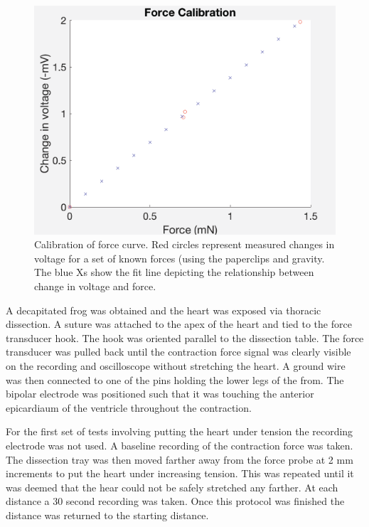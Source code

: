 \documentclass[12pt]{article}
\begin{document}
\begin{figure}[H]
	\label{fig:forceCal}
	\centering
	\includegraphics[width = .95\textwidth]{Figures/ForceCal.png}
	\caption{Calibration of force curve. Red circles represent measured changes in voltage for a  set of known forces (using the paperclips and gravity. The blue Xs show the fit line depicting the relationship between change in voltage and force. }
\end{figure}
\par{}
A decapitated frog was obtained and the heart was exposed via thoracic dissection. A suture was attached to the apex of the heart and tied to the force transducer hook. The hook was oriented parallel to the dissection table. The force transducer was pulled back until the contraction force signal was clearly visible on the recording and oscilloscope without stretching the heart. A ground wire was then connected to one of the pins holding the lower legs of the from. The bipolar electrode was positioned such that it was touching the anterior epicardiaum of the ventricle throughout the contraction. 
\par{}
For the first set of tests involving putting the heart under tension the recording electrode was not used. A baseline recording of the contraction force was taken. The dissection tray was then moved farther away from the force probe at 2 mm increments to put the heart under increasing tension. This was repeated until it was deemed that the hear could not be safely stretched any farther. At each distance a 30 second recording was taken. Once this protocol was finished the distance was returned to the starting distance.
\end{document}
